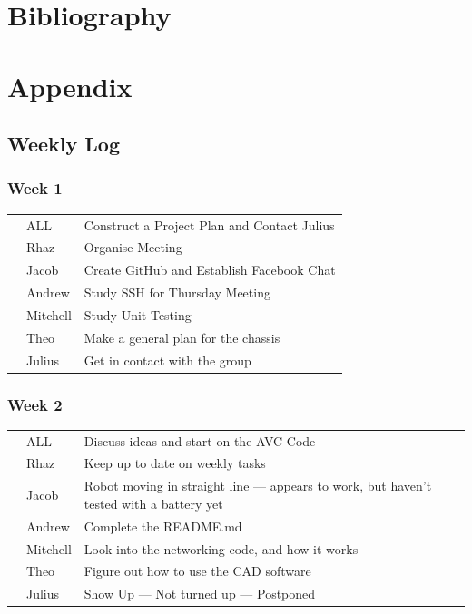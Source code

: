 \documentclass[paper=a4, fontsize=11pt]{scrartcl} %
\def\checkmark{\tikz\fill[scale=0.4] (0,.35) -- (.25,0) -- (1,.7) -- (.25,.15) -- cycle;}
\def\scalecheck{\resizebox{\widthof{\checkmark}*\ratio{\widthof{x}}{\widthof{\normalsize x}}}{!}{\checkmark}}
\numberwithin{equation}{section} %
\numberwithin{figure}{section} %
\begin{document}
\section{Bibliography}
\printbibliography

\section{Appendix}

\subsection{Weekly Log}

\subsubsection*{Week 1}
\begin{tabularx}{\textwidth}{clX}
\scalecheck & ALL      & Construct a Project Plan and Contact Julius\\
\scalecheck & Rhaz     & Organise Meeting\\
\scalecheck & Jacob    & Create GitHub and Establish Facebook Chat\\
\scalecheck & Andrew   & Study SSH for Thursday Meeting\\
\scalecheck & Mitchell & Study Unit Testing\\
\scalecheck & Theo     & Make a general plan for the chassis\\
\scalecheck & Julius   & Get in contact with the group
\end{tabularx}

\subsubsection*{Week 2}
\begin{tabularx}{\textwidth}{clX}
\scalecheck  & ALL      & Discuss ideas and start on the AVC Code\\
\scalecheck  & Rhaz     & Keep up to date on weekly tasks\\
& Jacob    & Robot moving in straight line --- appears to work, but haven't tested with a battery yet\\
\scalecheck  & Andrew   & Complete the README.md\\
\scalecheck  & Mitchell & Look into the networking code, and how it works\\
\scalecheck  & Theo     & Figure out how to use the CAD software\\
& Julius   & Show Up --- Not turned up --- Postponed\\
\end{tabularx}
\end{document}
